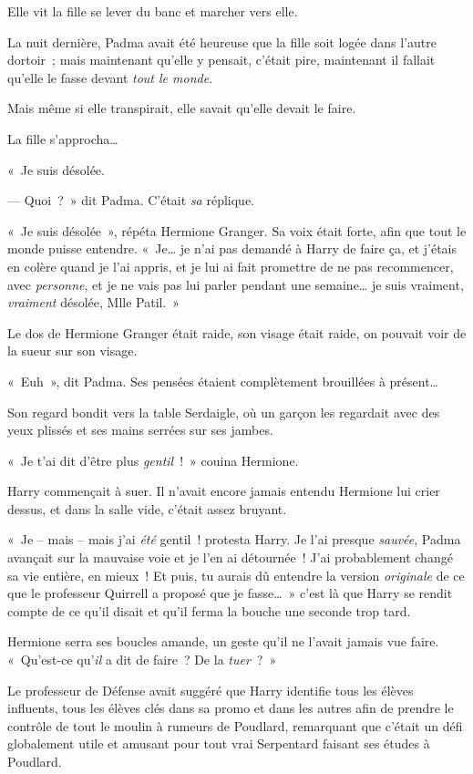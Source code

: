 Elle vit la fille se lever du banc et marcher vers elle.

La nuit dernière, Padma avait été heureuse que la fille soit logée dans l'autre dortoir~; mais maintenant qu'elle y pensait, c'était pire, maintenant il fallait qu'elle le fasse devant \emph{tout le monde}.

Mais même si elle transpirait, elle savait qu'elle devait le faire.

La fille s'approcha…

«~Je suis désolée.

--- Quoi~?~»
dit Padma.
C'était \emph{sa} réplique.

«~Je suis désolée~», répéta Hermione Granger.
Sa voix était forte, afin que tout le monde puisse entendre.
«~Je… je n'ai pas demandé à Harry de faire ça, et j'étais en colère quand je l'ai appris, et je lui ai fait promettre de ne pas recommencer, avec \emph{personne}, et je ne vais pas lui parler pendant une semaine… je suis vraiment, \emph{vraiment} désolée, Mlle Patil.~»

Le dos de Hermione Granger était raide, son visage était raide, on pouvait voir de la sueur sur son visage.

«~Euh~», dit Padma.
Ses pensées étaient complètement brouillées à présent…

Son regard bondit vers la table Serdaigle, où un garçon les regardait avec des yeux plissés et ses mains serrées sur ses jambes.


«~Je t'ai dit d'être plus \emph{gentil}~!~»
couina Hermione.

Harry commençait à suer.
Il n'avait encore jamais entendu Hermione lui crier dessus, et dans la salle vide, c'était assez bruyant.

«~Je -- mais -- mais j'ai \emph{été} gentil~! protesta Harry.
Je l'ai presque \emph{sauvée}, Padma avançait sur la mauvaise voie et je l'en ai détournée~!
J'ai probablement changé sa vie entière, en mieux~!
Et puis, tu aurais dû entendre la version \emph{originale} de ce que le professeur Quirrell a proposé que je fasse…~»
c'est là que Harry se rendit compte de ce qu'il disait et qu'il ferma la bouche une seconde trop tard.

Hermione serra ses boucles amande, un geste qu'il ne l'avait jamais vue faire.
«~Qu'est-ce qu'\emph{il} a dit de faire~?
De la \emph{tuer}~?~»

Le professeur de Défense avait suggéré que Harry identifie tous les élèves influents, tous les élèves clés dans sa promo et dans les autres afin de prendre le contrôle de tout le moulin à rumeurs de Poudlard, remarquant que c'était un défi globalement utile et amusant pour tout vrai Serpentard faisant ses études à Poudlard.

